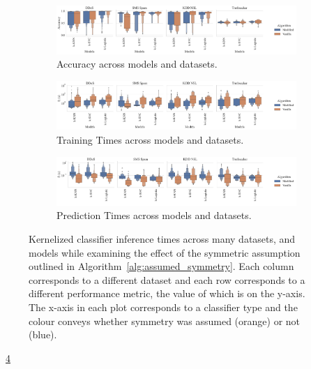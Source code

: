 \documentclass{article}
\begin{document}
\begin{figure}[t]
    \centering
    \begin{subfigure}[t]{\textwidth}
        \includegraphics[width=\textwidth]{figs/combined/modified_models_vs_accuracy.pdf}
        \caption{Accuracy across models and datasets.}
        \label{fig:mod_acc}
    \end{subfigure}
    \begin{subfigure}[t]{\textwidth}
        \centering
        \includegraphics[width=\textwidth]{figs/combined/modified_models_vs_train_time.pdf}
        \caption{Training Times across models and datasets.}
        \label{fig:mod_train_time}
    \end{subfigure}
    \begin{subfigure}[t]{\textwidth}
        \includegraphics[width=\textwidth]{figs/combined/modified_models_vs_predict_time.pdf}
        \caption{Prediction Times across models and datasets.}
        \label{fig:mod_pred_time}
    \end{subfigure}
    \caption{Kernelized classifier inference times across many datasets, and models while examining the effect of the symmetric assumption outlined in Algorithm~\ref{alg:assumed_symmetry}. Each column corresponds to a different dataset and each row corresponds to a different performance metric, the value of which is on the y-axis. The x-axis in each plot corresponds to a classifier type and the colour conveys whether symmetry was assumed (orange) or not (blue).}
    \label{fig:mod_summary}
\end{figure}

\lipsum[1]~\ref{fig:mod_summary}
\end{document}
